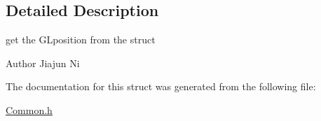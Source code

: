 \subsection{Detailed Description}
get the G\-Lposition from the struct 

\begin{DoxyAuthor}{Author}
Jiajun Ni 
\end{DoxyAuthor}


The documentation for this struct was generated from the following file\-:\begin{DoxyCompactItemize}
\item 
\hyperlink{Common_8h}{Common.\-h}\end{DoxyCompactItemize}
